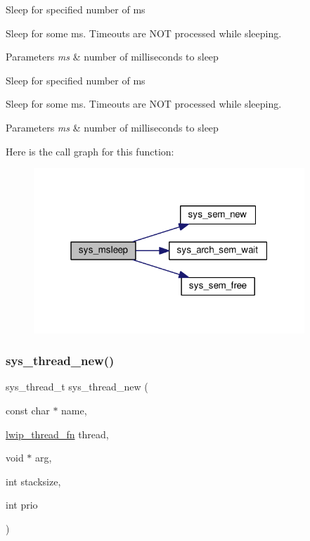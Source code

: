 Sleep for specified number of ms

Sleep for some ms. Timeouts are N\+OT processed while sleeping.


\begin{DoxyParams}{Parameters}
{\em ms} & number of milliseconds to sleep\\
\hline
\end{DoxyParams}
Sleep for specified number of ms

Sleep for some ms. Timeouts are N\+OT processed while sleeping.


\begin{DoxyParams}{Parameters}
{\em ms} & number of milliseconds to sleep \\
\hline
\end{DoxyParams}
Here is the call graph for this function\+:
\nopagebreak
\begin{figure}[H]
\begin{center}
\leavevmode
\includegraphics[width=289pt]{group__sys__misc_ga6b8786f43e779953e8b74e983c88682e_cgraph}
\end{center}
\end{figure}
\mbox{\label{group__sys__misc_ga0d596afdd8dbcfad320172d39b0f607a}} 
\subsubsection{\texorpdfstring{sys\+\_\+thread\+\_\+new()}{sys\_thread\_new()}}
{\footnotesize\ttfamily sys\+\_\+thread\+\_\+t sys\+\_\+thread\+\_\+new (\begin{DoxyParamCaption}\item[{const char $\ast$}]{name,  }\item[{\hyperlink{openmote-cc2538_2lwip_2src_2include_2lwip_2sys_8h_ae30a77bf6bd69bfcc5f235eaad54f2b9}{lwip\+\_\+thread\+\_\+fn}}]{thread,  }\item[{void $\ast$}]{arg,  }\item[{int}]{stacksize,  }\item[{int}]{prio }\end{DoxyParamCaption})}

